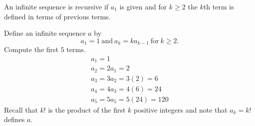 \begin{definition}
    An infinite sequence is recursive if \(a_1\) is given and for \(k\ge2\) the \(k\)th term is defined in terms of previous terms.
\end{definition}

\begin{example}
    Define an infinite sequence \(a\) by
    \[a_1 = 1 \ \textrm{and} \ a_k = ka_{k-1} \ \textrm{for} \ k\ge 2.\]
    Compute the first \(5\) terms.
    \begin{gather*}
        a_1 =1 \\
        a_2 = 2a_1 = 2 \\
        a_3 = 3a_2 = 3\left(2\right) = 6\\
        a_4 = 4a_3 = 4 \left(6\right) = 24\\
        a_5 = 5a_5 = 5\left(24\right) = 120
    \end{gather*}
    Recall that \(k!\) is the product of the first \(k\) positive integers and note that \(a_k = k!\) defines \(a.\) 
\end{example}